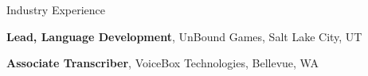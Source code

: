 \begin{rubric}{Industry Experience}

    \entry*[2011 -- 2013][\faUserTie]%
        \textbf{Lead, Language Development}, UnBound Games, Salt Lake City, UT
    
    \entry*[2008][\faUserTie]%
        \textbf{Associate Transcriber}, VoiceBox Technologies, Bellevue, WA
        
        \end{rubric}